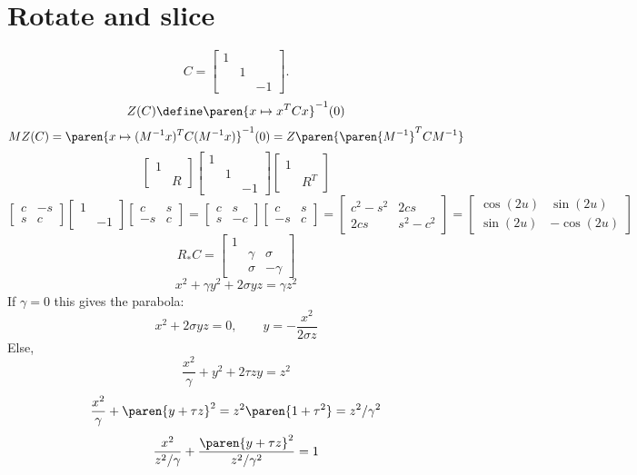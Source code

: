 \documentclass{scrartcl}
\begin{document}
\section{Rotate and slice}
\[
  C = \begin{bmatrix} 1 \\ & 1 \\ & & -1 \end{bmatrix}.
\]
\[
  Z(C)\define \paren{x\mapsto x^T C x}^{-1}(0)
\]
\[
  MZ(C) = \paren{x\mapsto (M^{-1}x)^T C (M^{-1}x)}^{-1}(0) = Z\paren{\paren{M^{-1}}^T C M^{-1}}
\]
\[
  \begin{bmatrix}
    1 & \\
      & R
  \end{bmatrix}
  \begin{bmatrix}
   1 & \\
     & 1 \\
     &  & -1
  \end{bmatrix}
  \begin{bmatrix}
    1 & \\
      & R^T
  \end{bmatrix}
\]
\[
  \begin{bmatrix}
    c & -s \\ s & c
  \end{bmatrix}
  \begin{bmatrix}
    1 \\ & -1
  \end{bmatrix}
  \begin{bmatrix}
    c & s \\ -s & c
  \end{bmatrix}
  = 
  \begin{bmatrix} 
    c & s \\ s & -c
  \end{bmatrix}
  \begin{bmatrix}
    c & s \\ -s & c
  \end{bmatrix}
  = 
  \begin{bmatrix}
    c^2-s^2 & 2cs \\
    2cs     & s^2 - c^2
  \end{bmatrix}
  = 
  \begin{bmatrix}
     \cos(2u) & \sin(2u) \\ \sin(2u) & -\cos(2u) 
  \end{bmatrix}
\]
\[
  R_*C = \begin{bmatrix} 1 \\ & \gamma & \sigma \\ & \sigma & -\gamma \end{bmatrix}
\]
\[
x^2 + \gamma y^2 + 2\sigma yz = \gamma z^2 
\]
If \(\gamma=0\) this gives the parabola:
\[
  x^2 + 2\sigma y z = 0,\quad \quad y = -\frac{x^2}{2\sigma z}
\]
Else,
\[
\frac{x^2}{\gamma} + {y^2 + 2\tau z y} = z^2
\]
\[
\frac{x^2}{\gamma} + \paren{y + \tau z}^2 = z^2\paren{1+\tau^2} = z^2/\gamma^2
\]
\[
\frac{x^2}{z^2/\gamma} + \frac{\paren{y+\tau z}^2}{z^2/\gamma^2} = 1
\]
\end{document}
